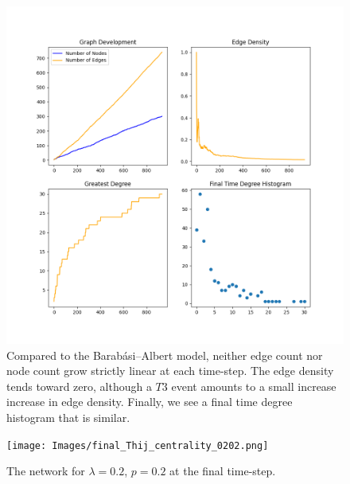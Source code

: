 \begin{figure}[h!]
    \includegraphics[width=14cm]{Images/twitter_sim_stats_3_0.2_0.2.png}
    \centering
    \caption{Compared to the Barabási–Albert model, neither edge count nor node
     count grow strictly linear at each time-step. The edge density tends toward
     zero, although a $T3$ event amounts to a small increase increase in edge density. Finally, we 
    see a final time degree histogram that is similar.}
\end{figure}

\begin{figure}[h!]
    \texttt{[image: Images/final\_Thij\_centrality\_0202.png]}
    \centering
    \caption{The network for $\lambda=0.2$, $p=0.2$ at the final time-step.}
\end{figure}

\clearpage

